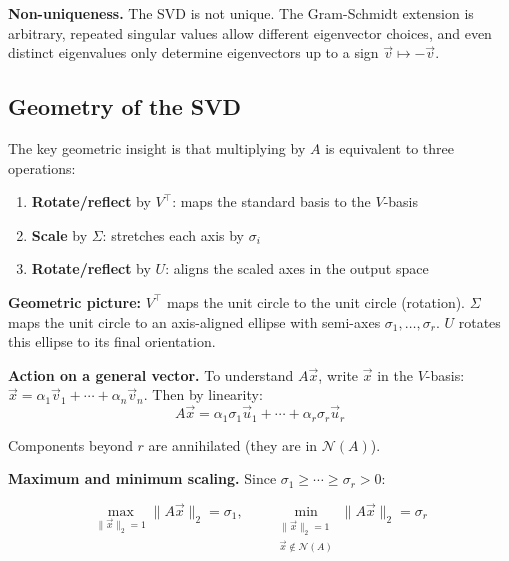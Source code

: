 \documentclass[10pt, twocolumn]{article}
\theoremstyle{definition}
\theoremstyle{plain}
\newcommand{\NN}{\mathcal{N}}
\begin{document}
\begin{tcolorbox}[colframe=black!50]
\textbf{Non-uniqueness.} The SVD is not unique. The Gram-Schmidt extension is arbitrary, repeated singular values allow different eigenvector choices, and even distinct eigenvalues only determine eigenvectors up to a sign $\vec{v} \mapsto -\vec{v}$.
\end{tcolorbox}

\subsection{Geometry of the SVD}

The key geometric insight is that multiplying by $A$ is equivalent to three operations:
\begin{enumerate}
    \item \textbf{Rotate/reflect} by $V^\top$: maps the standard basis to the $V$-basis
    \item \textbf{Scale} by $\Sigma$: stretches each axis by $\sigma_i$
    \item \textbf{Rotate/reflect} by $U$: aligns the scaled axes in the output space
\end{enumerate}

\begin{tcolorbox}[colframe=black!50]
\textbf{Geometric picture:} $V^\top$ maps the unit circle to the unit circle (rotation). $\Sigma$ maps the unit circle to an axis-aligned ellipse with semi-axes $\sigma_1, \ldots, \sigma_r$. $U$ rotates this ellipse to its final orientation.
\end{tcolorbox}

\textbf{Action on a general vector.} To understand $A\vec{x}$, write $\vec{x}$ in the $V$-basis: $\vec{x} = \alpha_1 \vec{v}_1 + \cdots + \alpha_n \vec{v}_n$. Then by linearity:
\[
    A\vec{x} = \alpha_1 \sigma_1 \vec{u}_1 + \cdots + \alpha_r \sigma_r \vec{u}_r
\]

Components beyond $r$ are annihilated (they are in $\NN(A)$).

\textbf{Maximum and minimum scaling.} Since $\sigma_1 \ge \cdots \ge \sigma_r > 0$:
\begin{result}
\[
    \max_{\|\vec{x}\|_2 = 1} \|A\vec{x}\|_2 = \sigma_1, \qquad \min_{\substack{\|\vec{x}\|_2 = 1 \\ \vec{x} \notin \NN(A)}} \|A\vec{x}\|_2 = \sigma_r
\]
\end{result}
\end{document}
